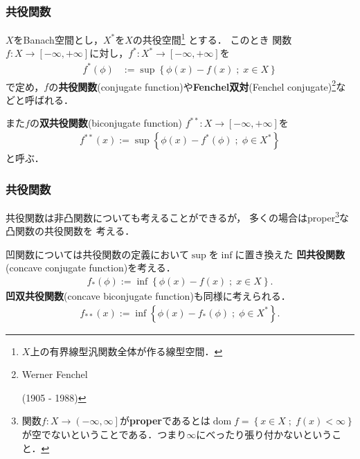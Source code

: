 \documentclass[10pt,usepdftitle=false,hyperref={unicode}]{beamer}
\DeclareMathOperator*{\dom}{dom}
\newcommand{\parentheses}[1]{\left(#1\right)}
\newcommand{\leftopenrightclose}[1]{\left(\left.#1\right]\right.}
\newcommand{\braces}[1]{\left\{#1\right\}}
\newcommand{\brackets}[1]{\left[#1\right]}
\begin{document}
\begin{frame}
\frametitle{共役関数}
$X$をBanach空間とし，$X^*$を$X$の共役空間\footnote[frame]{$X$上の有界線型汎関数全体が作る線型空間．}
とする．
このとき
関数
$f:X \to \brackets{-\infty,+\infty}$に対し，$f^*: X^* \to \brackets{-\infty,+\infty}$を
\begin{align*}
    f^*\parentheses{\phi} &:= \sup \braces{\phi\parentheses{x} - f\parentheses{x} \;;\; x \in X}
\end{align*}
で定め，$f$の\textbf{共役関数}(conjugate function)や\textbf{Fenchel双対}(Fenchel conjugate)\footnote[frame]{Werner Fenchel \begin{ipafont}\end{ipafont} (1905 - 1988)}\nocite{borwein2010convex}などと呼ばれる．

\bigskip

また$f$の\textbf{双共役関数}(biconjugate function) $f^{**}: X \to \brackets{-\infty,+\infty}$を
\begin{align*}
    f^{**}\parentheses{x} := \sup \braces{\phi(x) - f^*\parentheses{\phi} \;;\; \phi \in X^*}
\end{align*}
と呼ぶ．

\end{frame}

\begin{frame}
\frametitle{共役関数}
共役関数は非凸関数についても考えることができるが，
多くの場合はproper\footnote[frame]{関数$f:X\to\leftopenrightclose{-\infty,\infty}$が\textbf{proper}であるとは$\dom f = \braces{x \in X\;;\; f\parentheses{x} < \infty}$が空でないということである．つまり$\infty$にべったり張り付かないということ．}な凸関数の共役関数を
考える．

\bigskip

凹関数については共役関数の定義において$\sup$を$\inf$に置き換えた
\textbf{凹共役関数}(concave conjugate function)を考える．
\begin{align*}
    f_*\parentheses{\phi} := \inf \braces{\phi\parentheses{x} - f\parentheses{x} \;;\; x \in X}.
\end{align*}
\textbf{凹双共役関数}(concave biconjugate function)も同様に考えられる．
\begin{align*}
    f_{**}\parentheses{x} := \inf \braces{\phi\parentheses{x} - f_*\parentheses{\phi} \;;\; \phi \in X^*}.
\end{align*}
\end{frame}
\end{document}
